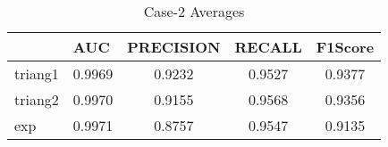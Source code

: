 \begin{table}[htbp]
  \centering
  \caption{Case-2 Averages}
    \begin{tabular}{|p{2.945em}|c|c|c|c|}
    \toprule
    \rowcolor[rgb]{ .718,  .871,  .91} \multicolumn{1}{|l|}{Policy} & \multicolumn{1}{l|}{AUC} & \multicolumn{1}{l|}{PRECISION} & \multicolumn{1}{l|}{RECALL} & \multicolumn{1}{l|}{F1Score} \\
    \midrule
    \rowcolor[rgb]{ .847,  .894,  .737} triang1 & 0.9969 & 0.9232 & 0.9527 & 0.9377 \\
    \midrule
    \rowcolor[rgb]{ .847,  .894,  .737} triang2 & 0.9970 & 0.9155 & 0.9568 & 0.9356 \\
    \midrule
    \rowcolor[rgb]{ .847,  .894,  .737} exp   & 0.9971 & 0.8757 & 0.9547 & 0.9135 \\
    \bottomrule
    \end{tabular}%
  \label{tab:sk36mean}%
\end{table}%
